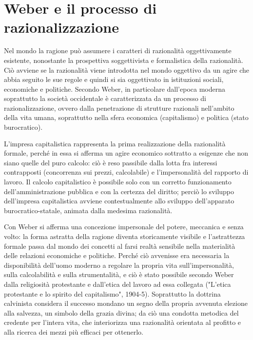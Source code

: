 \section{Weber e il processo di razionalizzazione}

Nel mondo la ragione può assumere i caratteri di razionalità oggettivamente esistente, nonostante la prospettiva soggettivista e formalistica della razionalità. Ciò avviene se la razionalità viene introdotta nel mondo oggettivo da un agire che abbia seguito le sue regole e quindi si sia oggettivato in istituzioni sociali, economiche e politiche. Secondo Weber, in particolare dall'epoca moderna soprattutto la società occidentale è caratterizzata da un processo di razionalizzazione, ovvero dalla penetrazione di strutture razionali  nell'ambito della vita umana, soprattutto  nella sfera economica (capitalismo) e politica (stato burocratico).

L'impresa capitalistica rappresenta la prima realizzazione della razionalità formale, perché in essa si afferma un agire economico sottratto a esigenze che non siano quelle del puro calcolo: ciò è reso passibile dalla lotta fra interessi contrapposti (concorrenza sui prezzi, calcolabile) e l'impersonalità del rapporto di lavoro.
Il calcolo capitalistico è possibile solo con un corretto funzionamento dell'amministrazione pubblica e con la certezza del diritto; perciò lo sviluppo dell'impresa capitalistica avviene contestualmente allo sviluppo dell'apparato burocratico-statale, animata dalla medesima razionalità.

Con Weber si afferma una concezione impersonale del potere, meccanica e senza volto: la forma astratta della ragione diventa storicamente visibile e l'astrattezza formale passa dal mondo dei concetti al farsi realtà sensibile nella materialità delle relazioni economiche e politiche. Perché ciò avvenisse era necessaria la disponibilità dell'uomo moderno a regolare la propria vita sull'impersonalità, sulla calcolabilità e sulla strumentalità, e ciò è stato possibile secondo Weber dalla religiosità protestante e dall'etica del lavoro ad essa collegata ("L'etica protestante e lo spirito del capitalismo", 1904-5). Soprattutto  la dottrina calvinista considera il successo mondano  un segno della propria avvenuta elezione alla salvezza, un simbolo della grazia divina; da ciò una condotta metodica del credente per l'intera vita, che interiorizza una razionalità orientata al profitto e alla ricerca dei mezzi più efficaci per ottenerlo.

